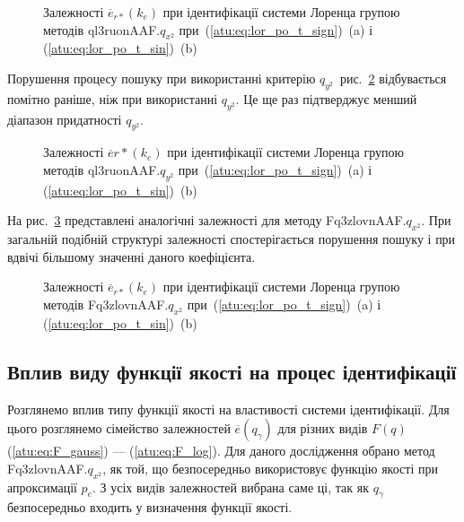 \begin{figure}[htb!]
  \caption{Залежності $\overline{e}_{r *}(k_e)$ при ідентифікації системи Лоренца групою методів ql3ruonAAF.$q_{x^2} $ при~(\ref{atu:eq:lor_po_t_sign})~(a) і (\ref{atu:eq:lor_po_t_sin})~(b)}
  \label{atu:f:lor_ke_ql3ruonAAF.q_x2}
\end{figure}

Порушення процесу пошуку при використанні критерію
$q_{y^2}$~рис.~\ref{atu:f:lor_ke_ql3ruonAAF.q_y2} відбувається помітно раніше,
ніж при використанні
$q_{y^2}$. Це ще раз підтверджує менший діапазон придатності
$q_{y^2}$.

\begin{figure}[htb!]
  \caption{Залежності $ \overline{e}{r *}(k_e)$ при ідентифікації системи Лоренца групою методів ql3ruonAAF.$q_{y^2} $ при~(\ref{atu:eq:lor_po_t_sign})~(a) і (\ref{atu:eq:lor_po_t_sin})~(b)}
  \label{atu:f:lor_ke_ql3ruonAAF.q_y2}
\end{figure}

На рис.~\ref{atu:f:lor_ke_Fq3zlovnAAF.q_x2} представлені аналогічні залежності
для методу Fq3zlovnAAF.$q_{x^2} $. При загальній подібній структурі залежності
спостерігається порушення пошуку і при вдвічі більшому значенні
даного коефіцієнта.

\begin{figure}[htb!]
  \caption{Залежності $ \overline{e}_{r *}(k_e)$ при ідентифікації системи Лоренца групою методів Fq3zlovnAAF.$q_{x^2} $ при~(\ref{atu:eq:lor_po_t_sign})~(a) і (\ref{atu:eq:lor_po_t_sin})~(b)}
  \label{atu:f:lor_ke_Fq3zlovnAAF.q_x2}
\end{figure}





\subsection{Вплив виду функції якості на процес ідентифікації}%

Розглянемо вплив типу функції якості на властивості системи
ідентифікації. Для цього розглянемо сімейство залежностей
$\overline{e}(q_\gamma) $ для різних видів
$F (q) $ (\ref{atu:eq:F_gauss}) --- (\ref{atu:eq:F_log}). Для даного дослідження обрано
метод Fq3zlovnAAF.$q_{x^2} $, як той, що безпосередньо використовує функцію якості при
апроксимації $ p_e $. З усіх видів залежностей вибрана саме ці, так як
$q_\gamma $ безпосередньо входить у визначення функції якості.


